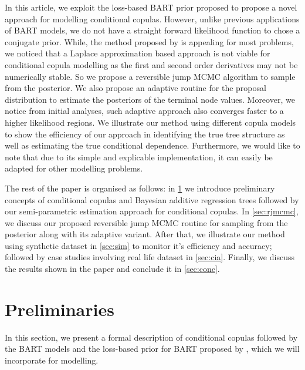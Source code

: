 \documentclass{amsart}
\begin{document}
In this article, we exploit the loss-based BART prior proposed \citet{serafini2024lossbasedpriortreetopologies} to propose a novel approach for modelling conditional copulas. However, unlike previous applications of BART models, we do not have a straight forward likelihood function to chose a conjugate prior. While, the method proposed by \citet{Linero02012025} is appealing for most problems, we noticed that a Laplace approximation based approach is not
viable for conditional copula modelling as the first and second order derivatives may not be numerically stable. So we propose a reversible jump MCMC algorithm to sample from the posterior. We also propose an adaptive routine for the proposal distribution to estimate the posteriors of the terminal node values. Moreover, we notice from initial analyses, such adaptive approach also converges faster to a higher likelihood regions. We illustrate our method using different copula models to show the efficiency of our approach in identifying the true tree structure as well as estimating the true conditional dependence. Furthermore, we would like to note that due to its simple and explicable implementation, it can easily be adapted for other modelling problems. 

The rest of the paper is organised as follows: in \cref{sec:prelim} we introduce preliminary concepts of conditional copulas and Bayesian additive regression trees followed by our semi-parametric estimation approach for conditional copulas. In \cref{sec:rjmcmc}, we discuss our proposed reversible jump MCMC routine for sampling from the posterior along with its adaptive variant. After that, we illustrate our method using synthetic dataset in \cref{sec:sim} to monitor it's efficiency and accuracy; followed by case studies involving real life dataset in \cref{sec:cia}. Finally, we discuss the results shown in the paper and conclude it in \cref{sec:conc}.

\section{Preliminaries}\label{sec:prelim}

In this section, we present a formal description of conditional copulas followed by the BART models and the loss-based prior for BART proposed by \citet{serafini2024lossbasedpriortreetopologies}, which we will incorporate for modelling.
\end{document}
